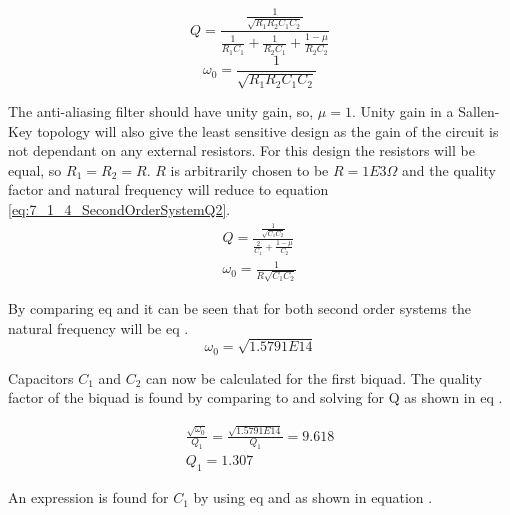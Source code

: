 \begin{equation}\label{eq:7_1_4_SecondOrderSystemQ}
    Q = \frac{ \frac{1}{\sqrt{R_1R_2C_1C_2}} }{ \frac{1}{R_1C_1} + \frac{1}{R_2C_1} + \frac{1-\mu}{R_2C_2}}
 \end{equation}
 \begin{equation}\label{eq:7_1_4_SecondOrderSystemNatural}
    \omega_0 = \frac{1}{\sqrt{R_1 R_2 C_1 C_2}}
 \end{equation}

 The anti-aliasing filter should have unity gain, so, $\mu = 1$. Unity gain in a Sallen-Key topology will also give the least sensitive design as the gain of the circuit is not dependant on any external resistors. For this design the resistors will be equal, so $R_1 = R_2 = R$. $R$ is arbitrarily chosen to be $R = 1E3 \Omega$ and the quality factor and natural frequency will reduce to equation \ref{eq:7_1_4_SecondOrderSystemQ2}.
 \begin{equation}\label{eq:7_1_4_SecondOrderSystemQ2}
    \begin{aligned}
        Q = \frac{ \frac{1}{\sqrt{C_1C_2}} }{ \frac{2}{C_1} + \frac{1-\mu}{C_2}}\\
        \omega_0 = \frac{1}{R\sqrt{C_1 C_2}}
    \end{aligned}
 \end{equation}

By comparing eq  and  it can be seen that for both second order systems the natural frequency will be eq .
\begin{equation}\label{eq:7_1_4_SecondOrderSystemNaturalFrq}
    \omega_0 = \sqrt{1.5791E14}
 \end{equation}

 Capacitors $C_1$ and $C_2$ can now be calculated for the first biquad. The quality factor of the biquad is found by comparing  to  and solving for Q as shown in eq .

 \begin{equation}\label{eq:7_1_4_Q1}
    \begin{aligned}
        \frac{\sqrt{\omega_0}}{Q_1} = \frac{\sqrt{1.5791E14}}{Q_1}= 9.618\\
        Q_1 = 1.307
    \end{aligned}
 \end{equation}

 An expression is found for $C_1$ by using eq  and  as shown in equation .

